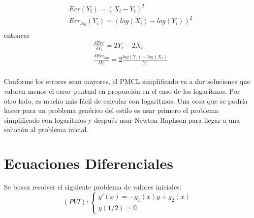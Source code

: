 \documentclass{endm}
\begin{document}
\begin{align*}
&Err(Y_i)= (X_i-Y_i)^2\\
&Err_{log}(Y_i)= (log(X_i)-log(Y_i))^2\\
\end{align*}
entonces
\begin{align*}
&\frac{\delta Err}{\delta Y_i} = 2Y_i - 2X_i\\
&\frac{\delta Err_{log}}{\delta Y_i} = 2\frac{log(Y_i)-log(X_i)}{Y_i}\\
\end{align*}

Conforme los errores sean mayores, el PMCL simplificado va a dar soluciones que valoren menos el error puntual en proporción en el caso de los logaritmos. Por otro lado, es mucho más fácil de calcular con logaritmos. Una cosa que se podría hacer para un problema genérico del estilo es usar primero el problema simplificado con logaritmos y después usar Newton Raphson para llegar a una solución al problema inicial.

\section{Ecuaciones Diferenciales}
Se busca resolver el siguiente problema de valores iniciales:
\begin{equation*}
    (PVI):\begin{cases}
        y'(x) = -g_1(x)y + g_2(x) \\
        y(1/2) = 0
    \end{cases}
\end{equation*}

\end{document}
